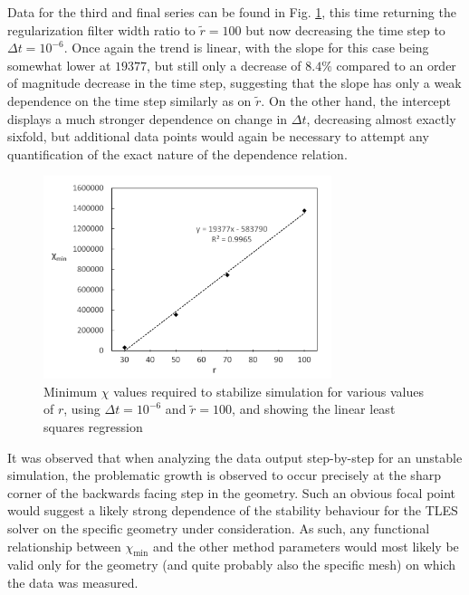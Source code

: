 Data for the third and final series can be found in Fig. \ref{fig:min_chi_dt6_r100}, this time returning the regularization filter width ratio to $\tilde{r}=100$ but now decreasing the time step to $\Delta t=10^{-6}$. Once again the trend is linear, with the slope for this case being somewhat lower at $19377$, but still only a decrease of $8.4\%$  compared to an order of magnitude decrease in the time step, suggesting that the slope has only a weak dependence on the time step similarly as on $\tilde{r}$. On the other hand, the intercept displays a much stronger dependence on change in $\Delta t$, decreasing almost exactly sixfold, but additional data points would again be necessary to attempt any quantification of the exact nature of the dependence relation.

\begin{figure}[!t]
\centering
\includegraphics[width=0.75\textwidth]{figures/min_chi_dt6_r100.pdf}
\caption{Minimum $\chi$ values required to stabilize simulation for various values of $r$, using $\Delta t=10^{-6}$ and $\tilde{r}=100$, and showing the linear least squares regression}
\label{fig:min_chi_dt6_r100}
\end{figure}

It was observed that when analyzing the data output step-by-step for an unstable simulation, the problematic growth is observed to occur precisely at the sharp corner of the backwards facing step in the geometry. Such an obvious focal point would suggest a likely strong dependence of the stability behaviour for the TLES solver on the specific geometry under consideration. As such, any functional relationship between $\chi_{\mathrm{min}}$ and the other method parameters would most likely be valid only for the geometry (and quite probably also the specific mesh) on which the data was measured.

